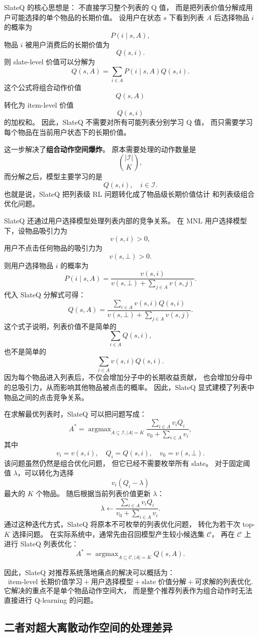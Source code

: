 \documentclass[11pt]{ctexart}
\begin{document}
SlateQ 的核心思想是：
不直接学习整个列表的 Q 值，
而是把列表价值分解成用户可能选择的单个物品的长期价值。
设用户在状态 $s$ 下看到列表 $A$ 后选择物品 $i$ 的概率为
\[
P(i\mid s,A),
\]
物品 $i$ 被用户消费后的长期价值为
\[
Q(s,i).
\]
则 slate-level 价值可以分解为
\[
Q(s,A)
=
\sum_{i\in A}
P(i\mid s,A)Q(s,i).
\]
这个公式将组合动作价值
\[
Q(s,A)
\]
转化为 item-level 价值
\[
Q(s,i)
\]
的加权和。
因此，SlateQ 不需要对所有可能列表分别学习 Q 值，
而只需要学习每个物品在当前用户状态下的长期价值。

这一步解决了\textbf{组合动作空间爆炸}。
原本需要处理的动作数量是
\[
\binom{|\mathcal{I}|}{K},
\]
而分解之后，模型主要学习的是
\[
Q(s,i), \quad i\in\mathcal{I}.
\]
也就是说，SlateQ 把列表级 RL 问题转化成了物品级长期价值估计
和列表级组合优化问题。

SlateQ 还通过用户选择模型处理列表内部的竞争关系。
在 MNL 用户选择模型下，设物品吸引力为
\[
v(s,i)>0,
\]
用户不点击任何物品的吸引力为
\[
v(s,\bot)>0.
\]
则用户选择物品 $i$ 的概率为
\[
P(i\mid s,A)
=
\frac{
v(s,i)
}{
v(s,\bot)+\sum_{j\in A}v(s,j)
}.
\]
代入 SlateQ 分解式可得：
\[
Q(s,A)
=
\frac{
\sum_{i\in A}v(s,i)Q(s,i)
}{
v(s,\bot)+\sum_{j\in A}v(s,j)
}.
\]
这个式子说明，列表价值不是简单的
\[
\sum_{i\in A}Q(s,i),
\]
也不是简单的
\[
\sum_{i\in A}v(s,i)Q(s,i).
\]
因为每个物品进入列表后，不仅会增加分子中的长期收益贡献，
也会增加分母中的总吸引力，从而影响其他物品被点击的概率。
因此，SlateQ 显式建模了列表中物品之间的点击竞争关系。

在求解最优列表时，SlateQ 可以把问题写成：
\[
A^*
=
\mathop{\arg\max}_{A\subseteq \mathcal{I}, |A|=K}
\frac{
\sum_{i\in A}v_iQ_i
}{
v_0+\sum_{i\in A}v_i
},
\]
其中
\[
v_i=v(s,i),\quad Q_i=Q(s,i),\quad v_0=v(s,\bot).
\]
该问题虽然仍然是组合优化问题，
但它已经不需要枚举所有 slate。
对于固定阈值 $\lambda$，可以转化为选择
\[
v_i(Q_i-\lambda)
\]
最大的 $K$ 个物品。
随后根据当前列表价值更新 $\lambda$：
\[
\lambda
\leftarrow
\frac{
\sum_{i\in A}v_iQ_i
}{
v_0+\sum_{i\in A}v_i
}.
\]
通过这种迭代方式，SlateQ 将原本不可枚举的列表优化问题，
转化为若干次 top-$K$ 选择问题。
在实际系统中，通常先由召回模型产生较小候选集 $\mathcal{C}$，
再在 $\mathcal{C}$ 上进行 SlateQ 列表优化：
\[
A^*
=
\mathop{\arg\max}_{A\subseteq \mathcal{C}, |A|=K}
Q(s,A).
\]

因此，SlateQ 对推荐系统落地痛点的解决可以概括为：
\[
\text{item-level 长期价值学习}
+
\text{用户选择模型}
+
\text{slate 价值分解}
+
\text{可求解的列表优化}.
\]
它解决的重点不是单个物品动作空间大，
而是整个推荐列表作为组合动作时无法直接进行 Q-learning 的问题。

\subsection{二者对超大离散动作空间的处理差异}
\end{document}
